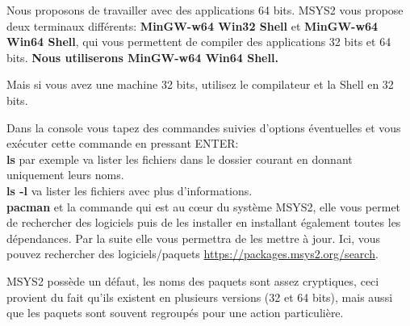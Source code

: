 \documentclass{article}
\begin{document}
Nous proposons de travailler avec des applications 64 bits. MSYS2 vous propose deux terminaux différents: \textbf{MinGW-w64 Win32 Shell} et \textbf{MinGW-w64 Win64 Shell}, qui vous permettent de compiler des applications 32 bits et 64 bits. {\color{MidnightBlue}\textbf{Nous utiliserons MinGW-w64 Win64 Shell.}}

Mais si vous avez une machine 32 bits, utilisez le compilateur et la Shell en 32 bits.

\begin{tcolorbox}[width=\textwidth,colframe=black,colback={white},title={Quelques rudiments de l'utilisation de la ligne de commande dans une console.},outer arc=0mm,colupper=black]    
      Dans la console vous tapez des commandes suivies d'options éventuelles et vous exécuter cette commande en pressant ENTER: \\
\newline
\textbf{ls} par exemple va lister les fichiers dans le dossier courant en donnant uniquement leurs noms. \\
\textbf{ls -l} va lister les fichiers avec plus d'informations.\\
\newline
\textbf{pacman} et la commande qui est au cœur du système MSYS2, elle vous permet de rechercher des logiciels puis de les installer en installant également toutes les dépendances. Par la suite elle vous permettra de les mettre à jour. Ici, vous pouvez rechercher des logiciels/paquets \href{https://packages.msys2.org/search}{https://packages.msys2.org/search}.
\end{tcolorbox}
 
MSYS2 possède un défaut, les noms des paquets sont assez cryptiques, ceci provient du fait qu'ils existent en plusieurs versions (32 et 64 bits), mais aussi que les paquets sont souvent regroupés pour une action particulière.
\end{document}
